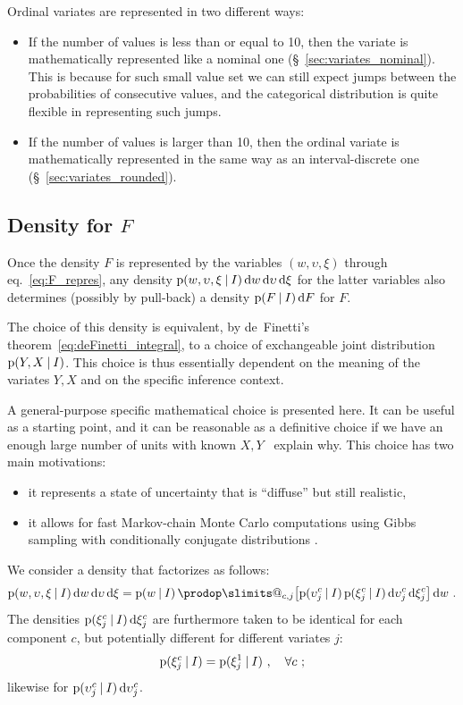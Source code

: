 \documentclass[a4paper,12pt,%
onecolumn,oneside,article,%
british%
]{memoir}
\makeatletter
\def\prod{\DOTSI\prodop\slimits@}
\newcommand*{\wrench}{{\fontencoding{U}\fontfamily{fontawesomethree}\selectfont\symbol{114}}}
\newcommand{\mynotew}[1]{{\footnotesize\color{notecolour}\wrench\ #1}}
\newcommand*{\di}{\mathop{}\!\mathrm{d}}%
\newcommand*{\p}{\mathrm{p}}%
\renewcommand*{\|}[1][]{\nonscript\:#1\vert\nonscript\:\mathopen{}}
\newcommand*{\sect}{\S}%
\newcommand*{\eqn}{eq.}%
\newcommand*{\cf}{{cf.}}
\makeatother
\begin{document}
Ordinal variates are represented in two different ways:
\begin{itemize}[para]
\item If the number of values is less than or equal to 10, then the variate is mathematically represented like a nominal one (\sect~\ref{sec:variates_nominal}). This is because for such small value set we can still expect jumps between the probabilities of consecutive values, and the categorical distribution is quite flexible in representing such jumps.
\item If the number of values is larger than 10, then the ordinal variate is mathematically represented in the same way as an interval-discrete one (\sect~\ref{sec:variates_rounded}).
\end{itemize}


\subsection{Density for $F$}
\label{sec:density_F}

Once the density $F$ is represented by the variables $(w, \upsilon, \xi)$ through \eqn~\eqref{eq:F_repres}, any density $\p(w, \upsilon, \xi \|I)\di w \di\upsilon \di\xi$ for the latter variables also determines (possibly by pull-back) a density $\p(F  \| I) \di F$ for $F$.

The choice of this density is equivalent, by de~Finetti's theorem~\eqref{eq:deFinetti_integral}, to a choice of exchangeable joint distribution $\p(Y, X \|I)$. This choice is thus essentially dependent on the meaning of the variates $Y,X$ and on the specific inference context.

A general-purpose specific mathematical choice is presented here. It can be useful as a starting point, and it can be reasonable as a definitive choice if we have an enough large number of units with known $X,Y$ \mynotew{explain why}.
This choice has two main motivations:
\begin{itemize}
\item it represents a state of uncertainty that is \enquote{diffuse} but still realistic,
\item it allows for fast Markov-chain Monte Carlo computations using Gibbs sampling with conditionally conjugate distributions \autocites[\cf][]{goerueretal2010}.
\end{itemize}

We consider a density that factorizes as follows:
\begin{equation}
  \label{eq:density_factorizes}
  \p(w, \upsilon, \xi \|I)
  \di w \di\upsilon \di\xi =
  \p(w \|I)\,
  \prod_{c,j}\bigl[\p(\upsilon^{c}_{j} \|I)\,
  \p(\xi^{c}_{j} \|I) \di\upsilon^{c}_{j} \di\xi^{c}_{j}\bigr]
  \di w 
  \ .
\end{equation}
The densities $\p(\xi^{c}_{j} \|I)\di\xi^{c}_{j}$ are furthermore taken to be identical for each component $c$, but potentially different for different variates $j$:
\begin{equation}
  \label{eq:density_same_c}
  \p(\xi^{c}_{j} \|I) = \p(\xi^{1}_{j} \|I) \ ,\quad\forall c \ ;
\end{equation}
likewise for $\p(\upsilon^{c}_{j} \|I)\di\upsilon^{c}_{j}$.
\end{document}

